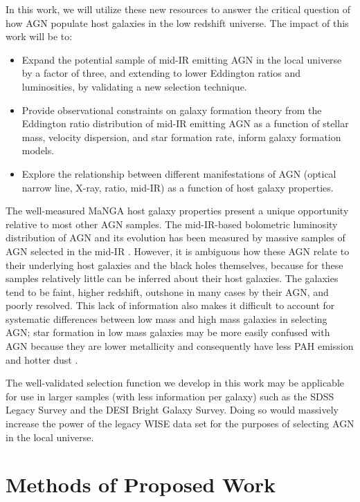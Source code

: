 \documentclass[12pt, preprint]{hacked-aastex}
\begin{document}
In this work, we will utilize these new resources to answer the
critical question of how AGN populate host galaxies in the low
redshift universe. The impact of this work will be to:
\begin{itemize}
    \item Expand the potential sample of mid-IR emitting AGN in the
      local universe by a factor of three, and extending to lower
      Eddington ratios and luminosities, by validating a new selection
      technique.
    \item Provide observational constraints on galaxy formation theory
      from the Eddington ratio distribution of mid-IR emitting AGN as
      a function of stellar mass, velocity dispersion, and star
      formation rate, inform galaxy formation models.
    \item Explore the relationship between different manifestations of
      AGN (optical narrow line, X-ray, ratio, mid-IR) as a function of
      host galaxy properties.
\end{itemize}

The well-measured MaNGA host galaxy properties present a unique
opportunity relative to most other AGN samples.  The mid-IR-based
bolometric luminosity distribution of AGN and its evolution has been
measured by massive samples of AGN selected in the mid-IR
\cite{lacy15a}. However, it is ambiguous how these AGN relate to their
underlying host galaxies and the black holes themselves, because for
these samples relatively little can be inferred about their host
galaxies.  The galaxies tend to be faint, higher redshift, outshone in
many cases by their AGN, and poorly resolved.  This lack of
information also makes it difficult to account for systematic
differences between low mass and high mass galaxies in selecting AGN;
star formation in low mass galaxies may be more easily confused with
AGN because they are lower metallicity and consequently have less PAH
emission and hotter dust \cite{hainline16a, sajina22a}.

The well-validated selection function we develop in this work may be
applicable for use in larger samples (with less information per
galaxy) such as the SDSS Legacy Survey and the DESI Bright Galaxy
Survey. Doing so would massively increase the power of the legacy WISE
data set for the purposes of selecting AGN in the local universe.

\section{Methods of Proposed Work\label{sec:methods}}
\end{document}
